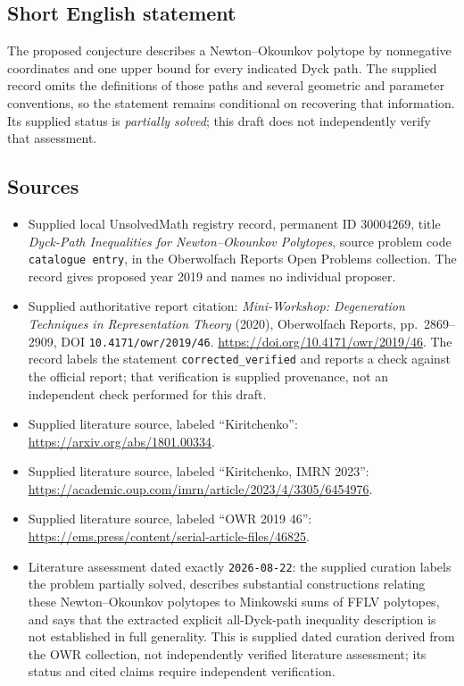 \documentclass[11pt]{article}
\begin{document}
\subsection{Short English statement}
The proposed conjecture describes a Newton--Okounkov polytope by nonnegative coordinates and one upper bound for every indicated Dyck path. The supplied record omits the definitions of those paths and several geometric and parameter conventions, so the statement remains conditional on recovering that information. Its supplied status is \emph{partially solved}; this draft does not independently verify that assessment.
\subsection{Sources}
\begin{itemize}
\item Supplied local UnsolvedMath registry record, permanent ID \(30004269\), title \emph{Dyck-Path Inequalities for Newton--Okounkov Polytopes}, source problem code \texttt{catalogue entry}, in the Oberwolfach Reports Open Problems collection. The record gives proposed year 2019 and names no individual proposer.
\item Supplied authoritative report citation: \emph{Mini-Workshop: Degeneration Techniques in Representation Theory} (2020), Oberwolfach Reports, pp.~2869--2909, DOI \texttt{10.4171/owr/2019/46}. \url{https://doi.org/10.4171/owr/2019/46}. The record labels the statement \texttt{corrected\_verified} and reports a check against the official report; that verification is supplied provenance, not an independent check performed for this draft.
\item Supplied literature source, labeled ``Kiritchenko'': \url{https://arxiv.org/abs/1801.00334}.
\item Supplied literature source, labeled ``Kiritchenko, IMRN 2023'': \url{https://academic.oup.com/imrn/article/2023/4/3305/6454976}.
\item Supplied literature source, labeled ``OWR 2019 46'': \url{https://ems.press/content/serial-article-files/46825}.
\item Literature assessment dated exactly \texttt{2026-08-22}: the supplied curation labels the problem partially solved, describes substantial constructions relating these Newton--Okounkov polytopes to Minkowski sums of FFLV polytopes, and says that the extracted explicit all-Dyck-path inequality description is not established in full generality. This is supplied dated curation derived from the OWR collection, not independently verified literature assessment; its status and cited claims require independent verification.
\end{itemize}
\end{document}
